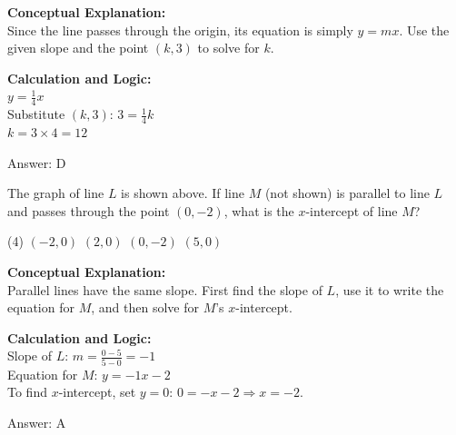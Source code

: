 \documentclass[11pt,paper=a4,answers]{exam}
\begin{document}
\begin{questions}
\begin{solution}
\textbf{Conceptual Explanation:} \\
Since the line passes through the origin, its equation is simply $y = mx$. Use the given slope and the point $(k, 3)$ to solve for $k$.

\vspace{10pt}
\textbf{Calculation and Logic:} \\
$y = \frac{1}{4}x$ \\
Substitute $(k, 3)$: $3 = \frac{1}{4}k$ \\
$k = 3 \times 4 = 12$

\vspace{15pt}
Answer: \colorbox{yellow!100}{D}
\end{solution}

\vspace{20pt}

\question

The graph of line $L$ is shown above. If line $M$ (not shown) is parallel to line $L$ and passes through the point $(0, -2)$, what is the $x$-intercept of line $M$?
\begin{tasks}(4)
    \task $(-2, 0)$
    \task $(2, 0)$
    \task $(0, -2)$
    \task $(5, 0)$
\end{tasks}
\begin{center}
\end{center}
\begin{solution}
\textbf{Conceptual Explanation:} \\
Parallel lines have the same slope. First find the slope of $L$, use it to write the equation for $M$, and then solve for $M$'s $x$-intercept.

\vspace{10pt}
\textbf{Calculation and Logic:} \\
Slope of $L$: $m = \frac{0 - 5}{5 - 0} = -1$ \\
Equation for $M$: $y = -1x - 2$ \\
To find $x$-intercept, set $y = 0$: $0 = -x - 2 \Rightarrow x = -2$.

\vspace{15pt}
Answer: \colorbox{yellow!100}{A}
\end{solution}


\end{questions}
\end{document}
